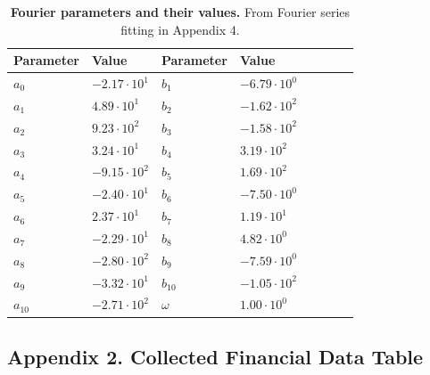 \documentclass{mcmthesis}
\begin{document}
\begin{table}[!htbp]
    \begin{tabularx}{\textwidth}{XlXlXlXl}
        \toprule
        \textbf{Parameter} & \textbf{Value} & \textbf{Parameter} & \textbf{Value} \\
        \midrule
        $a_0$ & $-2.17 \cdot 10^1$ & $b_1$ & $-6.79 \cdot 10^0$ \\
        $a_1$ & $4.89 \cdot 10^1$ & $b_2$ & $-1.62 \cdot 10^2$ \\
        $a_2$ & $9.23 \cdot 10^2$ & $b_3$ & $-1.58 \cdot 10^2$ \\
        $a_3$ & $3.24 \cdot 10^1$ & $b_4$ & $3.19 \cdot 10^2$ \\
        $a_4$ & $-9.15 \cdot 10^2$ & $b_5$ & $1.69 \cdot 10^2$ \\
        $a_5$ & $-2.40 \cdot 10^1$ & $b_6$ & $-7.50 \cdot 10^0$ \\
        $a_6$ & $2.37 \cdot 10^1$ & $b_7$ & $1.19 \cdot 10^1$ \\
        $a_7$ & $-2.29 \cdot 10^1$ & $b_8$ & $4.82 \cdot 10^0$ \\
        $a_8$ & $-2.80 \cdot 10^2$ & $b_9$ & $-7.59 \cdot 10^0$ \\
        $a_9$ & $-3.32 \cdot 10^1$ & $b_{10}$ & $-1.05 \cdot 10^2$ \\
        $a_{10}$ & $-2.71 \cdot 10^2$ & $\omega$ & $1.00 \cdot 10^0$ \\
        \bottomrule
    \end{tabularx}
    \caption{\textbf{Fourier parameters and their values.} From Fourier series fitting in Appendix 4.}
    \label{tab:fourierparams}
\end{table}

\newpage 
\subsection{Appendix 2. Collected Financial Data Table}
\end{document}
